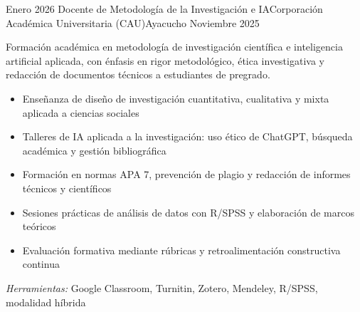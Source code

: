 \experience
{Enero 2026} {Docente de Metodología de la Investigación e IA}{Corporación Académica Universitaria (CAU)}{Ayacucho}
{Noviembre 2025} {
	Formación académica en metodología de investigación científica e inteligencia artificial aplicada, con énfasis en rigor metodológico, ética investigativa y redacción de documentos técnicos a estudiantes de pregrado.
	\begin{itemize}
		\item Enseñanza de diseño de investigación cuantitativa, cualitativa y mixta aplicada a ciencias sociales
		\item Talleres de IA aplicada a la investigación: uso ético de ChatGPT, búsqueda académica y gestión bibliográfica
		\item Formación en normas APA 7, prevención de plagio y redacción de informes técnicos y científicos
		\item Sesiones prácticas de análisis de datos con R/SPSS y elaboración de marcos teóricos
		\item Evaluación formativa mediante rúbricas y retroalimentación constructiva continua
	\end{itemize}
}
{\footnotesize{\emph{Herramientas:} Google Classroom, Turnitin, Zotero, Mendeley, R/SPSS, modalidad híbrida}}
